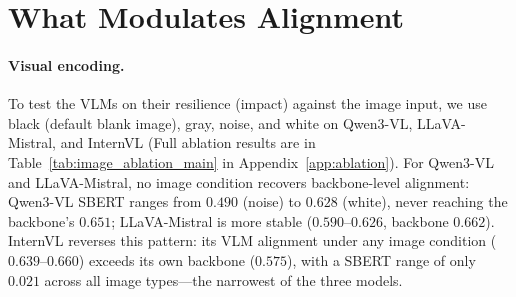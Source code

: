\documentclass[letterpaper]{article}
\begin{document}

\section{What Modulates Alignment}
\label{sec:ablation}

\paragraph{Visual encoding.}
To test the VLMs on their resilience (impact) against the image input, we use black (default blank image), gray, noise, and white on Qwen3-VL, LLaVA-Mistral, and InternVL (Full ablation results are in Table~\ref{tab:image_ablation_main} in Appendix~\ref{app:ablation}). %
For Qwen3-VL and LLaVA-Mistral, no image condition recovers backbone-level alignment:
Qwen3-VL SBERT ranges from $0.490$ (noise) to $0.628$ (white), never reaching the backbone's $0.651$;
LLaVA-Mistral is more stable ($0.590$--$0.626$, backbone $0.662$).
InternVL reverses this pattern: its VLM alignment under any image condition ($0.639$--$0.660$) exceeds its own backbone ($0.575$), with a SBERT range of only $0.021$ across all image types---the narrowest of the three models.
\end{document}
